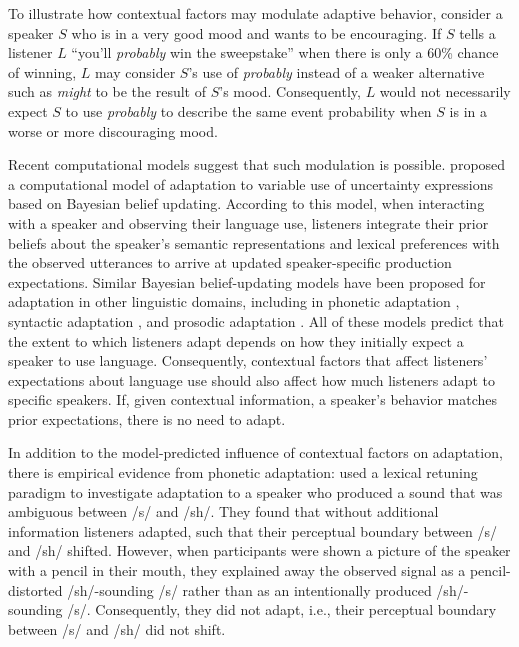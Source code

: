 \documentclass[man,floatsintext]{apa6}
\begin{document}
To illustrate how contextual factors may modulate adaptive behavior, consider a speaker $S$ who is in a very good mood and wants to be encouraging. If $S$ tells a listener $L$ ``you'll \textit{probably} win the sweepstake'' when there is only a 60\% chance of winning, $L$ may consider $S$'s use of \textit{probably} instead of a weaker alternative such as \textit{might} to be the result of $S$'s mood. Consequently, $L$ would not necessarily expect $S$ to use \textit{probably} to describe the same event probability when $S$ is in a worse or more discouraging mood.


Recent computational models suggest that such modulation is possible.   proposed a computational model of adaptation to variable use of uncertainty expressions based on Bayesian belief updating. According to this model, when interacting with a speaker and observing their language use, listeners integrate their prior beliefs about the speaker's semantic representations and lexical preferences with the observed utterances to arrive at updated speaker-specific production expectations. Similar Bayesian belief-updating models have been proposed for adaptation in other linguistic domains, including in phonetic adaptation \cite{Kleinschmidt2015}, syntactic adaptation \cite{Kleinschmidt2012}, and prosodic adaptation \cite{Roettger2019}. All of these models predict that the extent to which listeners adapt depends on how they initially expect a speaker to use language. Consequently, contextual factors that affect listeners' expectations about language use should also affect how much listeners adapt to specific speakers. If, given contextual information, a speaker's behavior matches prior expectations, there is no need to adapt.



In addition to the model-predicted influence of contextual factors on adaptation, there is  empirical evidence from phonetic adaptation:  used a lexical retuning paradigm to investigate adaptation to a speaker who produced a sound that was ambiguous between /s/ and /sh/. They found that without additional information listeners adapted, such that their perceptual boundary between /s/ and /sh/ shifted. However, when participants were shown a picture of the speaker with a pencil in their mouth, they explained away the observed signal as a pencil-distorted /sh/-sounding /s/ rather than as an intentionally produced /sh/-sounding /s/. Consequently, they did not adapt, i.e., their perceptual boundary between /s/ and /sh/ did not shift.
\end{document}
